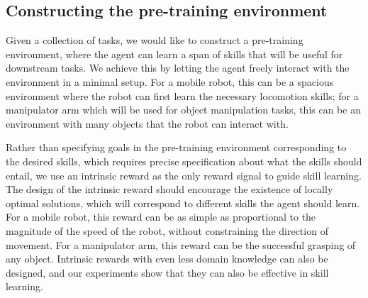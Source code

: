\documentclass{article} %
\begin{document}


\subsection{Constructing the pre-training environment}%
\label{section:method:pretraining}

Given a collection of tasks, we would like to construct a pre-training environment, where the agent can learn a span of skills that will be useful for downstream tasks. We achieve this by letting the agent freely interact with the environment in a minimal setup.
For a mobile robot, this can be a spacious environment where the robot can first learn the necessary locomotion skills; for a manipulator arm which will be used for object manipulation tasks, this can be an environment with many objects that the robot can interact with.

Rather than specifying goals in the pre-training environment corresponding to the desired skills, which requires precise specification about what the skills should entail, we use an intrinsic reward as the only reward signal to guide skill learning.
The design of the intrinsic reward should encourage the existence of locally optimal solutions, which will correspond to different skills the agent should learn.
For a mobile robot, this reward can be as simple as proportional to the magnitude of the speed of the robot, without constraining the direction of movement.
For a manipulator arm, this reward can be the successful grasping of any object.
Intrinsic rewards with even less domain knowledge can also be designed, and our experiments show that they can also be effective in skill learning.
\end{document}
